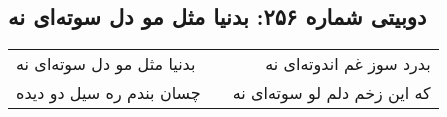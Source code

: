 \begin{center}
\section*{دوبیتی شماره ۲۵۶: بدنیا مثل مو دل سوته‌ای نه}
\label{sec:256}
\begin{longtable}{l p{0.5cm} r}
بدنیا مثل مو دل سوته‌ای نه
&&
بدرد سوز غم اندوته‌ای نه
\\
چسان بندم ره سیل دو دیده
&&
که این زخم دلم لو سوته‌ای نه
\\
\end{longtable}
\end{center}
